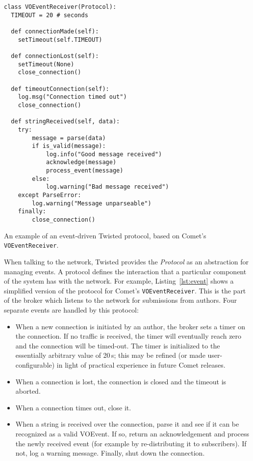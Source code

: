 \documentclass[5p,authoryear]{elsarticle}
\begin{document}
\begin{listing}[t]
\begin{verbatim}
class VOEventReceiver(Protocol):
  TIMEOUT = 20 # seconds

  def connectionMade(self):
    setTimeout(self.TIMEOUT)

  def connectionLost(self):
    setTimeout(None)
    close_connection()

  def timeoutConnection(self):
    log.msg("Connection timed out")
    close_connection()

  def stringReceived(self, data):
    try:
        message = parse(data)
        if is_valid(message):
            log.info("Good message received")
            acknowledge(message)
            process_event(message)
        else:
            log.warning("Bad message received")
    except ParseError:
        log.warning("Message unparseable")
    finally:
        close_connection()
\end{verbatim}
\caption{An example of an event-driven Twisted protocol, based on Comet's
\texttt{VOEventReceiver}.}
\label{lst:event}
\end{listing}


When talking to the network, Twisted provides the \textit{Protocol} as an
abstraction for managing events. A protocol defines the interaction that a
particular component of the system has with the network. For example,
Listing~\ref{lst:event} shows a simplified version of the protocol for Comet's
\texttt{VOEventReceiver}. This is the part of the broker which listens to the
network for submissions from authors. Four separate events are handled by this
protocol:

\begin{itemize}

\item{When a new connection is initiated by an author, the broker sets a timer
on the connection. If no traffic is received, the timer will eventually reach
zero and the connection will be timed-out. The timer is initialized to the
essentially arbitrary value of 20\,s; this may be refined (or made
user-configurable) in light of practical experience in future Comet releases.}

\item{When a connection is lost, the connection is closed and the timeout is
aborted.}

\item{When a connection times out, close it.}

\item{When a string is received over the connection, parse it and see if it
can be recognized as a valid VOEvent. If so, return an acknowledgement and
process the newly received event (for example by re-distributing it to
subscribers). If not, log a warning message. Finally, shut down the
connection.}

\end{itemize}
\end{document}
